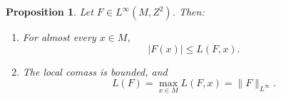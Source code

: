 \documentclass[reqno,11pt]{amsart}
\newcommand*\dif{\mathop{}\!\mathrm{d}}
\newcommand{\Chain}{\underline C}
\newtheorem{proposition}[theorem]{Proposition}
\theoremstyle{definition}
\numberwithin{equation}{section}
\begin{document}
\begin{proposition}\label{crandall}
Let $F \in L^\infty(M, Z^2)$. Then:
\begin{enumerate}
\item For almost every $x \in M$,
$$|F(x)| \leq L(F, x).$$
\label{crandall LDT}
\item The local comass is bounded, and \label{crandall linfinity}
$$L(F) = \max_{x \in M} L(F, x) = \|F\|_{L^\infty}.$$
\end{enumerate}
\end{proposition}
\end{document}
